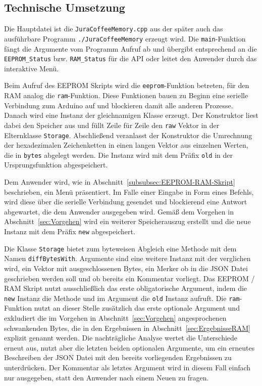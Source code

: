 \subsection{Technische Umsetzung}
Die Hauptdatei ist die \texttt{JuraCoffeeMemory.cpp} aus der später auch das ausführbare Programm \texttt{./JuraCoffeeMemory} erzeugt wird.
Die \texttt{main}-Funktion fängt die Argumente vom Programm Aufruf ab und übergibt entsprechend an die \texttt{EEPROM\_Status} bzw. \texttt{RAM\_Status} für die \ac{API} oder leitet den Anwender durch das interaktive Menü.

Beim Aufruf des \ac{EEPROM} Skripts wird die \texttt{eeprom}-Funktion betreten, für den \ac{RAM} analog die \texttt{ram}-Funktion.
Diese Funktionen bauen zu Beginn eine serielle Verbindung zum Arduino auf und blockieren damit alle anderen Prozesse.
Danach wird eine Instanz der gleichnamigen Klasse erzeugt.
Der Konstruktor liest dabei den Speicher aus und füllt Zeile für Zeile den \texttt{raw} Vektor in der Elternklasse \texttt{Storage}.
Abschließend veranlasst der Konstruktor die Umrechnung der hexadezimalen Zeichenketten in einen langen Vektor aus einzelnen Werten, die in \texttt{bytes} abgelegt werden.
Die Instanz wird mit dem Präfix \texttt{old} in der Ursprungsfunktion abgespeichert.

Dem Anwender wird, wie in Abschnitt~\ref{subsubsec:EEPROM-RAM-Skript} beschrieben, ein Menü präsentiert.
Im Falle einer Eingabe in Form eines Befehls, wird diese über die serielle Verbindung gesendet und blockierend eine Antwort abgewartet, die dem Anwender ausgegeben wird.
Gemäß dem Vorgehen in Abschnitt~\ref{sec:Vorgehen} wird ein weiterer Speicherauszug erstellt und die neue Instanz mit dem Präfix \texttt{new} abgespeichert.

Die Klasse \texttt{Storage} bietet zum byteweisen Abgleich eine Methode mit dem Namen \texttt{diffBytesWith}.
Argumente sind eine weitere Instanz mit der verglichen wird, ein Vektor mit ausgeschlossenen Bytes, ein Merker ob in die \ac{JSON} Datei geschrieben werden soll und ob bereits ein Kommentar vorliegt.
Das \ac{EEPROM} / \ac{RAM} Skript nutzt ausschließlich das erste obligatorische Argument, indem die \texttt{new} Instanz die Methode und im Argument die \texttt{old} Instanz aufruft.
Die \texttt{ram}-Funktion nutzt an dieser Stelle zusätzlich das erste optionale Argument und exkludiert die im Vorgehen in Abschnitt~\ref{sec:Vorgehen} angesprochenen schwankenden Bytes, die in den Ergebnissen in Abschnitt~\ref{sec:ErgebnisseRAM} explizit genannt werden.
Die nachträgliche Analyse wertet die Unterschiede erneut aus, nutzt aber die letzten beiden optionalen Argumente, um ein erneutes Beschreiben der \ac{JSON} Datei mit den bereits vorliegenden Ergebnissen zu unterdrücken.
Der Kommentar als letztes Argument wird in diesem Fall einfach nur ausgegeben, statt den Anwender nach einem Neuen zu fragen.

